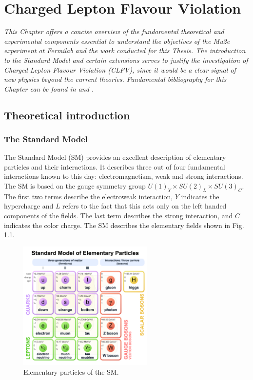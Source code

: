 \chapter{Charged Lepton Flavour Violation}\label{intr}
\textit{This Chapter offers a concise overview of the fundamental 
theoretical and experimental components essential to understand the objectives 
of the Mu2e experiment at Fermilab and the work conducted for this 
Thesis. The introduction to the Standard Model and certain extensions serves to 
justify the investigation of Charged Lepton Flavour Violation (CLFV), 
since it would be a clear signal of new physics beyond the current theories. 
Fundamental bibliography for this Chapter can be found in \cite{Bernstein_2013} and \cite{clfv_signorelli}.}
\section{Theoretical introduction}
\subsection{The Standard Model}
The Standard Model (SM) provides an excellent description of elementary particles and their interactions.
It describes three out of 
four fundamental interactions known to this day: electromagnetism,
weak and strong interactions.
The SM is 
based on the gauge symmetry group $U(1)_Y \times SU(2)_L \times SU(3)_C$. The 
first two terms describe the electroweak interaction, $Y$ indicates 
the hypercharge and $L$ refers to the fact that this acts only on the left handed components of the fields.
The last term describes the strong interaction, and $C$ indicates the color charge.
The SM describes the elementary fields shown in Fig. \ref{fig:sm}.

\begin{figure}[!h]
\centering
\includegraphics[width =0.6\textwidth]{figures/pdf/Standard_Model_of_Elementary_Particles.pdf}
\caption[Elementary particles of the Standard Model.]{Elementary particles of the SM.}
\label{fig:sm}
\end{figure}


